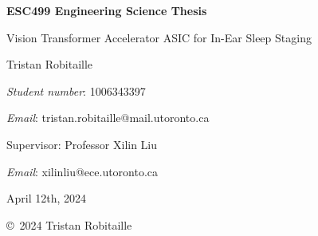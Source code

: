 \newpage
\begin{titlepage}
    \thispagestyle{empty}
    \centering
    {\LARGE\bfseries ESC499 Engineering Science Thesis\par}
    {\Large Vision Transformer Accelerator ASIC for In-Ear Sleep Staging\par}
    \vspace{8cm}
    {\Large Tristan Robitaille\par}
    {\textit{Student number}: 1006343397\par}
    {\textit{Email}: tristan.robitaille@mail.utoronto.ca\par}
    \vspace{5cm}
    {\large Supervisor: Professor Xilin Liu\par}
    {\textit{Email}: xilinliu@ece.utoronto.ca\par}
    \vspace{2cm}
    {\large April 12th, 2024\par}
    \vspace{2cm}
    \begin{center}
        \copyright\ 2024 Tristan Robitaille
    \end{center}        
\end{titlepage}